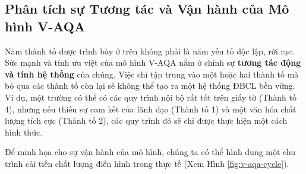 \documentclass[12pt, a4paper, openany]{report}
\begin{document}
\subsection{Phân tích sự Tương tác và Vận hành của Mô hình V-AQA}
\label{subsec:tuong_tac_V-AQA}

Năm thành tố được trình bày ở trên không phải là năm yếu tố độc lập, rời rạc. Sức mạnh và tính ưu việt của mô hình V-AQA nằm ở chính sự \textbf{tương tác động và tính hệ thống} của chúng. Việc chỉ tập trung vào một hoặc hai thành tố mà bỏ qua các thành tố còn lại sẽ không thể tạo ra một hệ thống ĐBCL bền vững. Ví dụ, một trường có thể có các quy trình nội bộ rất tốt trên giấy tờ (Thành tố 4), nhưng nếu thiếu sự cam kết của lãnh đạo (Thành tố 1) và một văn hóa chất lượng tích cực (Thành tố 2), các quy trình đó sẽ chỉ được thực hiện một cách hình thức.

Để minh họa cho sự vận hành của mô hình, chúng ta có thể hình dung một chu trình cải tiến chất lượng điển hình trong thực tế (Xem Hình \ref{fig:v-aqa-cycle}).
\end{document}
